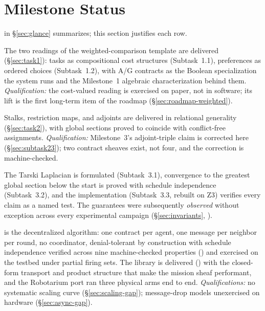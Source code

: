 \documentclass[11pt]{article}
\theoremstyle{definition}
\theoremstyle{remark}
\begin{document}
\section{Milestone Status}
\label{sec:status}

 in \S\ref{sec:glance} summarizes; this section justifies each row.

\begin{description}[leftmargin=1.8em,style=nextline]
\item[Task 1 --- Complete.]
  The two readings of the weighted-comparison template are delivered (\S\ref{sec:task1}): tasks
  as compositional cost structures (Subtask~1.1), preferences as ordered choices
  (Subtask~1.2), with A/G contracts as the Boolean specialization the system runs and the
  Milestone~1 algebraic characterization behind them.
  \emph{Qualification:} the cost-valued reading is exercised on paper, not in software; its
  lift is the first long-term item of the roadmap (\S\ref{sec:roadmap-weighted}).

\item[Task 2 --- Complete.]
  Stalks, restriction maps, and adjoints are delivered in relational generality
  (\S\ref{sec:task2}), with global sections proved to coincide with conflict-free assignments.
  \emph{Qualification:} Milestone~3's adjoint-triple claim is corrected here
  (\S\ref{sec:subtask23}); two contract sheaves exist, not four, and the correction is
  machine-checked.

\item[Task 3 --- Complete.]
  The Tarski Laplacian is formulated (Subtask~3.1), convergence to the greatest global section
  below the start is proved with schedule independence (Subtask~3.2), and the implementation
  (Subtask~3.3, rebuilt on Z3) verifies every claim as a named test. The guarantees were
  subsequently \emph{observed} without exception across every experimental campaign
  (\S\ref{sec:invariants}, ).

\item[Task 4 --- Complete.]
   is the decentralized algorithm: one contract per agent, one message per
  neighbor per round, no coordinator, denial-tolerant by construction with schedule
  independence verified across nine machine-checked properties () and
  exercised on the testbed under partial firing sets. The library is delivered
  () with the closed-form transport and product structure that make the
  mission sheaf performant, and the Robotarium port ran three physical arms end to end.
  \emph{Qualifications:} no systematic scaling curve (\S\ref{sec:scaling-gap}); message-drop
  models unexercised on hardware (\S\ref{sec:async-gap}).


\end{description}
\end{document}
